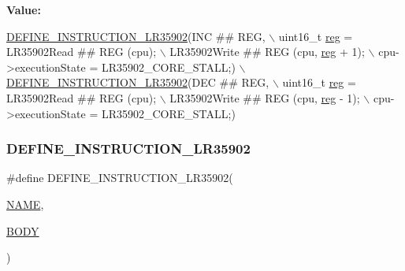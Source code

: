 {\bfseries Value\+:}
\begin{DoxyCode}
\mbox{\hyperlink{isa-lr35902_8c_a3128fc43c5d01e8b51f67901c0b4b5ef}{DEFINE\_INSTRUCTION\_LR35902}}(INC ## REG, \(\backslash\)
        uint16\_t \mbox{\hyperlink{decoder-arm_8c_af44c02f7785479603f59b662f3dfae6a}{reg}} = LR35902Read ## REG (cpu); \(\backslash\)
        LR35902Write ## REG (cpu, \mbox{\hyperlink{decoder-arm_8c_af44c02f7785479603f59b662f3dfae6a}{reg}} + 1); \(\backslash\)
        cpu->executionState = LR35902\_CORE\_STALL;) \(\backslash\)
    \mbox{\hyperlink{isa-lr35902_8c_a3128fc43c5d01e8b51f67901c0b4b5ef}{DEFINE\_INSTRUCTION\_LR35902}}(DEC ## REG, \(\backslash\)
        uint16\_t \mbox{\hyperlink{decoder-arm_8c_af44c02f7785479603f59b662f3dfae6a}{reg}} = LR35902Read ## REG (cpu); \(\backslash\)
        LR35902Write ## REG (cpu, \mbox{\hyperlink{decoder-arm_8c_af44c02f7785479603f59b662f3dfae6a}{reg}} - 1); \(\backslash\)
        cpu->executionState = LR35902\_CORE\_STALL;)
\end{DoxyCode}
\mbox{\label{isa-lr35902_8c_a3128fc43c5d01e8b51f67901c0b4b5ef}} 
\subsubsection{\texorpdfstring{D\+E\+F\+I\+N\+E\+\_\+\+I\+N\+S\+T\+R\+U\+C\+T\+I\+O\+N\+\_\+\+L\+R35902}{DEFINE\_INSTRUCTION\_LR35902}}
{\footnotesize\ttfamily \#define D\+E\+F\+I\+N\+E\+\_\+\+I\+N\+S\+T\+R\+U\+C\+T\+I\+O\+N\+\_\+\+L\+R35902(\begin{DoxyParamCaption}\item[{}]{\mbox{\hyperlink{inflate_8h_a164ea0159d5f0b5f12a646f25f99eceaa67bc2ced260a8e43805d2480a785d312}{N\+A\+ME}},  }\item[{}]{\mbox{\hyperlink{gzlog_8c_aa6bdf6a6d9916c343e1e17774d84a156}{B\+O\+DY}} }\end{DoxyParamCaption})}

